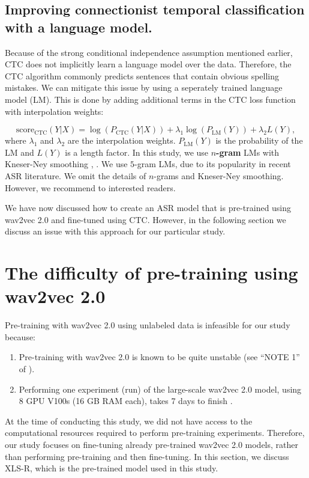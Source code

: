 \subsection{Improving connectionist temporal classification with a language model.} \label{subsec:lm-boost}
Because of the strong conditional independence assumption mentioned earlier,
CTC does not implicitly learn a language model over the data.
Therefore, the CTC algorithm commonly predicts sentences that contain obvious spelling mistakes.
We can mitigate this issue by using a seperately trained language model (LM).
This is done by adding additional terms in the CTC loss function with interpolation weights:

\begin{equation}
    \text{score}_{\text{CTC}}(Y|X) = \log\left(P_{\text{CTC}}(Y|X)\right) + \lambda_1 \log\left(P_{\text{LM}}(Y)\right) + \lambda_2 L(Y),
\end{equation}
where $\lambda_1$ and $\lambda_2$ are the interpolation weights. $P_{\text{LM}}(Y)$ is the probability of the LM and $L(Y)$ is a length factor.
In this study, we use \textbf{$n$-gram} LMs with Kneser-Ney smoothing \cite{shannon1948}, \cite{ney1994structuring}. 
We use $5$-gram LMs, due to its popularity in recent ASR literature.
We omit the details of $n$-grams and Kneser-Ney smoothing. However, we recommend \cite{jurafskyspeech} to interested readers.

We have now discussed how to create an ASR model that is pre-trained using wav2vec 2.0 and fine-tuned using CTC. 
However, in the following section we discuss an issue with this approach for our particular study.



\section{The difficulty of pre-training using wav2vec 2.0}
Pre-training with wav2vec 2.0 using unlabeled data is infeasible for our study because:
\begin{enumerate}
    \item Pre-training with wav2vec 2.0 is known to be quite unstable (see ``NOTE 1'' of \cite{vonplaten2021pretraining}).
    \item Performing one experiment (run) of the large-scale wav2vec 2.0 model, using 8 GPU V100s (16 GB RAM each), takes 7 days to finish \cite{vonplaten2021pretraining}.
\end{enumerate}
At the time of conducting this study, we did not have access to the computational resources required to perform pre-training experiments.
Therefore, our study focuses on fine-tuning already pre-trained wav2vec 2.0 models, rather than performing pre-training and then fine-tuning.
In this section, we discuss XLS-R, which is the pre-trained model used in this study.

